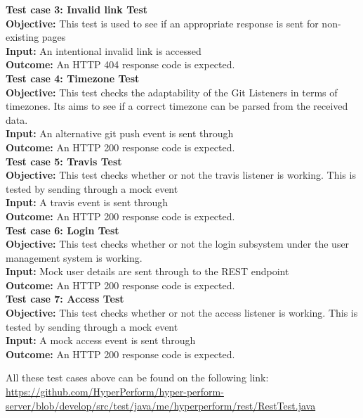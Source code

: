 \documentclass[11pt,a4paper]{article}
\begin{document}
\textbf{Test case 3: Invalid link Test} \\
\textbf{Objective: } This test is used to see if an appropriate response is sent for non-existing pages \\
\textbf{Input: } An intentional invalid link is accessed \\
\textbf{Outcome: } An HTTP 404 response code is expected. \\

\textbf{Test case 4: Timezone Test}  \\
\textbf{Objective: } This test checks the  adaptability of the Git Listeners in terms of timezones. Its aims to see if a correct timezone can be parsed from the received data. \\
\textbf{Input: } An alternative git push event is sent through \\
\textbf{Outcome: } An HTTP 200 response code is expected. \\

\textbf{Test case 5: Travis Test}  \\
\textbf{Objective: } This test checks whether or not the travis listener is working. This is tested by sending through a mock event \\
\textbf{Input: } A travis event is sent through \\
\textbf{Outcome: } An HTTP 200 response code is expected. \\

\textbf{Test case 6: Login Test}  \\
\textbf{Objective: } This test checks whether or not the login subsystem under the user management system is working.\\
\textbf{Input: } Mock user details are sent through to the REST endpoint \\
\textbf{Outcome: } An HTTP 200 response code is expected. \\

\textbf{Test case 7: Access Test}  \\
\textbf{Objective: } This test checks whether or not the access listener is working. This is tested by sending through a mock event \\
\textbf{Input: } A mock access event is sent through \\
\textbf{Outcome: } An HTTP 200 response code is expected. 

All these test cases above can be found on the following link: \url{https://github.com/HyperPerform/hyper-perform-server/blob/develop/src/test/java/me/hyperperform/rest/RestTest.java}
\end{document}
